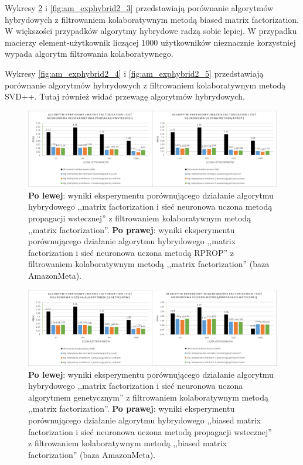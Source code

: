 \documentclass[twoside]{iisthesis}
\begin{document}
		Wykresy \ref{fig:am_exphybrid2_2} i \ref{fig:am_exphybrid2_3} przedstawiają porównanie algorytmów hybrydowych z filtrowaniem kolaboratywnym metodą biased matrix factorization. W większości przypadków algorytmy hybrydowe radzą sobie lepiej. W przypadku macierzy element-użytkownik liczącej 1000 użytkowników nieznacznie korzystniej wypada algorytm filtrowania kolaboratywnego.
		
		Wykresy \ref{fig:am_exphybrid2_4} i \ref{fig:am_exphybrid2_5} przedstawiają porównanie algorytmów hybrydowych z filtrowaniem kolaboratywnym metodą SVD++. Tutaj również widać przewagę algorytmów hybrydowych.
		
		\begin{figure}
			\centering
			\includegraphics[width=1\textwidth]{am_exphybrid2_1}			
			\caption{\textbf{Po lewej}: wyniki eksperymentu porównującego działanie algorytmu hybrydowego ,,matrix factorization i sieć neuronowa uczona metodą propagacji wstecznej'' z filtrowaniem kolaboratywnym metodą ,,matrix factorization''. \textbf{Po prawej}: wyniki eksperymentu porównującego działanie algorytmu hybrydowego ,,matrix factorization i sieć neuronowa uczona metodą RPROP'' z filtrowaniem kolaboratywnym metodą ,,matrix factorization'' (baza AmazonMeta).}
			\label{fig:am_exphybrid2_1}
		\end{figure}
		
		\begin{figure}
			\centering
			\includegraphics[width=1\textwidth]{am_exphybrid2_2}			
			\caption{\textbf{Po lewej}: wyniki eksperymentu porównującego działanie algorytmu hybrydowego ,,matrix factorization i sieć neuronowa uczona algorytmem genetycznym'' z filtrowaniem kolaboratywnym metodą ,,matrix factorization''. \textbf{Po prawej}: wyniki eksperymentu porównującego działanie algorytmu hybrydowego ,,biased matrix factorization i sieć neuronowa uczona metodą propagacji wstecznej'' z filtrowaniem kolaboratywnym metodą ,,biased matrix factorization'' (baza AmazonMeta).}
			\label{fig:am_exphybrid2_2}
		\end{figure}
		
\end{document}
